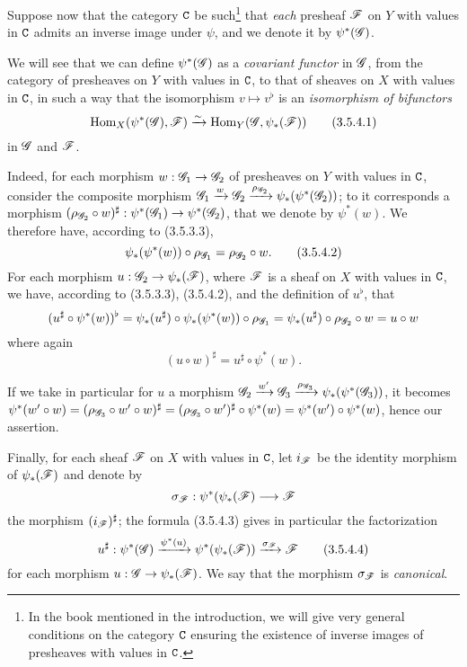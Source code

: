 \begin{env}[3.5.4]
\label{0.3.5.4}
Suppose now that the category $\mathtt{C}$ be such\footnote{In the book mentioned in the
introduction, we will give very general conditions on the category $\mathtt{C}$ ensuring
the existence of inverse images of presheaves with values in $\mathtt{C}$.} that
{\em each} presheaf $\mathscr{F}$ on $Y$ with values in $\mathtt{C}$ admits an inverse image
under $\psi$, and we denote it by $\psi^*(\mathscr{G})$.

We will see that we can define $\psi^*(\mathscr{G})$ as a {\em covariant functor} in
$\mathscr{G}$, from the category of presheaves on $Y$ with values in $\mathtt{C}$, to that of
sheaves on $X$ with values in $\mathtt{C}$, in such a way that the isomorphism
$v\mapsto v^\flat$ is an {\em isomorphism of bifunctors}
\[
  {\mathop{\mathrm{Hom}}\nolimits}_X(\psi^*(\mathscr{G}),\mathscr{F})\xrightarrow{\sim}{\mathop{\mathrm{Hom}}\nolimits}_Y(\mathscr{G},\psi_*(\mathscr{F}))
  \tag{3.5.4.1}
\]
in $\mathscr{G}$ and $\mathscr{F}$.

Indeed, for each morphism $w:\mathscr{G}_1\to\mathscr{G}_2$ of presheaves on $Y$ with
values in $\mathtt{C}$, consider the composite morphism
$\mathscr{G}_1\xrightarrow{w}\mathscr{G}_2
  \xrightarrow{\rho_{\mathscr{G}_2}}\psi_*(\psi^*(\mathscr{G}_2))$; to it corresponds a
morphism $(\rho_{\mathscr{G}_2}\circ w)^\sharp:\psi^*(\mathscr{G}_1)\to\psi^*(\mathscr{G}_2)$,
that we denote by $\psi^*(w)$. We therefore have, according to (3.5.3.3),
\[
  \psi_*(\psi^*(w))\circ\rho_{\mathscr{G}_1}=\rho_{\mathscr{G}_2}\circ w.
  \tag{3.5.4.2}
\]
For each morphism $u:\mathscr{G}_2\to\psi_*(\mathscr{F})$, where $\mathscr{F}$ is a sheaf on
$X$ with values in $\mathtt{C}$, we have, according to (3.5.3.3), (3.5.4.2), and the
definition of $u^\flat$, that
\[
  (u^\sharp\circ\psi^*(w))^\flat
  =\psi_*(u^\sharp)\circ\psi_*(\psi^*(w))\circ\rho_{\mathscr{G}_1}
  =\psi_*(u^\sharp)\circ\rho_{\mathscr{G}_2}\circ w=u\circ w
\]
where again
\[
  (u\circ w)^\sharp=u^\sharp\circ\psi^*(w).
  \tag{3.5.4.3}
\]

If we take in particular for $u$ a morphism
$\mathscr{G}_2\xrightarrow{w'}\mathscr{G}_3
  \xrightarrow{\rho_{\mathscr{G}_3}}\psi_*(\psi^*(\mathscr{G}_3))$, it becomes
$\psi^*(w'\circ w)=(\rho_{\mathscr{G}_3}\circ w'\circ w)^\sharp
  =(\rho_{\mathscr{G}_3}\circ w')^\sharp\circ\psi^*(w)=\psi^*(w')\circ\psi^*(w)$,
hence our assertion.

Finally, for each sheaf $\mathscr{F}$ on $X$ with values in $\mathtt{C}$, let $i_\mathscr{F}$ be
the identity morphism of $\psi_*(\mathscr{F})$ and denote by
\[
  \sigma_\mathscr{F}:\psi^*(\psi_*(\mathscr{F})\longrightarrow\mathscr{F}
\]
the morphism $(i_\mathscr{F})^\sharp$; the formula (3.5.4.3) gives in particular the
factorization
\[
  u^\sharp:\psi^*(\mathscr{G})\xrightarrow{\psi^*(u)}\psi^*(\psi_*(\mathscr{F}))
  \xrightarrow{\sigma_\mathscr{F}}\mathscr{F}
  \tag{3.5.4.4}
\]
for each morphism $u:\mathscr{G}\to\psi_*(\mathscr{F})$. We say that the morphism
$\sigma_\mathscr{F}$ is {\em canonical}.
\end{env}


